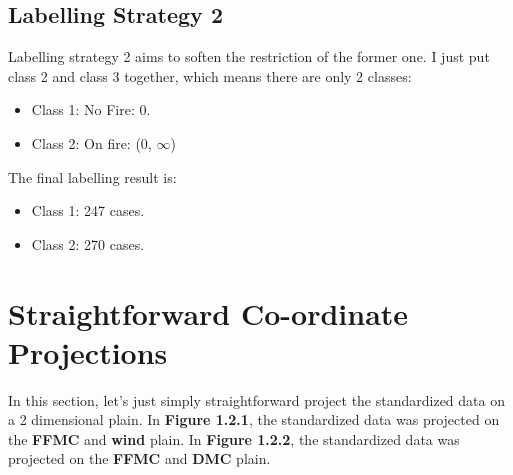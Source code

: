 \documentclass[titlepage,a4paper,12pt,thmsb]{report}
\begin{document}
\newpage

\subsection{Labelling Strategy 2}

Labelling strategy 2 aims to soften the restriction of the former one. I just put class 2 and class 3 together, which means there are only 2 classes:

\begin{itemize}
\item{Class 1: No Fire: 0.}
\item{Class 2: On fire: (0, $\infty$)}
\end{itemize}

The final labelling result is:

\begin{itemize}
\item{Class 1: 247 cases.}
\item{Class 2: 270 cases.}
\end{itemize}

\begin{center}
\begin{figure}[h]
{\par}
\end{figure}
{}
\end{center}

\newpage

\section{Straightforward Co-ordinate Projections}

In this section, let's just simply straightforward project the standardized data on a 2 dimensional plain. In {\bf{Figure 1.2.1}}, the standardized data was projected on the {\bf{FFMC}} and {\bf{wind}} plain. In {\bf{Figure 1.2.2}}, the standardized data was projected on the {\bf{FFMC}} and {\bf{DMC}} plain.
\end{document}
